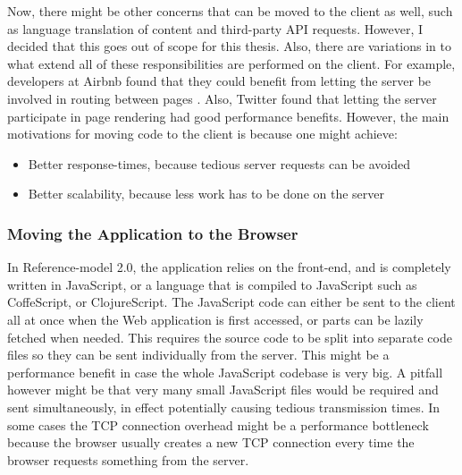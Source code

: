 Now, there might be other concerns that can be moved to the client as well, such as language translation of content and third-party API requests. However, I decided that this goes out of scope for this thesis. Also, there are variations in to what extend all of these responsibilities are performed on the client. For example, developers at Airbnb\cite{airbnb} found that they could benefit from letting the server be involved in routing between pages \cite{airbnbnode}. Also, Twitter \cite{twitter} found that letting the server participate in page rendering had good performance benefits\cite{timeToFirstTweet}. However, the main motivations for moving code to the client is because one might achieve:

\begin{itemize}
\item{} Better response-times, because tedious server requests can be avoided 
\item{} Better scalability, because less work has to be done on the server
\end{itemize} 
 
\subsubsection{Moving the Application to the Browser}
In Reference-model 2.0, the application relies on the front-end, and is completely written in JavaScript, or a language that is compiled to JavaScript such as CoffeScript, or ClojureScript. The JavaScript code can either be sent to the client all at once when the Web application is first accessed, or parts can be lazily fetched when needed. This requires the source code to be split into separate code files so they can be sent individually from the server. This might be a performance benefit in case the whole JavaScript codebase is very big. A pitfall however might be that very many small JavaScript files would be required and sent simultaneously, in effect potentially causing tedious transmission times. In some cases the TCP connection overhead might be a performance bottleneck because the browser usually creates a new TCP connection every time the browser requests something from the server. 

	
